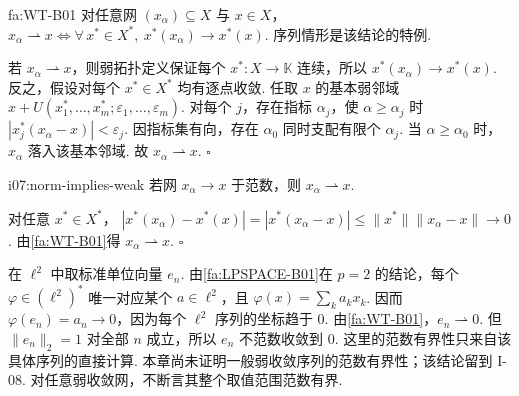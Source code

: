 \begin{FATheorem}[B][弱收敛的泛函刻画]{fa:WT-B01}
对任意网 \(\displaystyle (x_\alpha)\subseteq X\) 与 \(\displaystyle x\in X\)， \(\displaystyle x_\alpha\rightharpoonup x \iff \forall\,x^*\in X^*,\ x^*(x_\alpha)\to x^*(x)\).
序列情形是该结论的特例.
\end{FATheorem}

\begin{FAProof}
若 \(\displaystyle x_\alpha\rightharpoonup x\)，则弱拓扑定义保证每个 \(\displaystyle x^*:X\to\mathbb K\) 连续，所以 \(\displaystyle x^*(x_\alpha)\to x^*(x)\). 反之，假设对每个 \(\displaystyle x^*\in X^*\) 均有逐点收敛. 任取 \(\displaystyle x\) 的基本弱邻域 \(\displaystyle x+U(x_1^*,\dots,x_m^*;\varepsilon_1,\dots,\varepsilon_m)\).
对每个 \(\displaystyle j\)，存在指标 \(\displaystyle \alpha_j\)，使 \(\displaystyle \alpha\geqslant\alpha_j\) 时 \(\displaystyle |x_j^*(x_\alpha-x)|<\varepsilon_j\). 因指标集有向，存在 \(\displaystyle \alpha_0\) 同时支配有限个 \(\displaystyle \alpha_j\). 当 \(\displaystyle \alpha\geqslant\alpha_0\) 时，\(\displaystyle x_\alpha\) 落入该基本邻域. 故 \(\displaystyle x_\alpha\rightharpoonup x\).
\hfill\(\square\)
\end{FAProof}

\begin{FACorollary}[B][范数收敛蕴含弱收敛]{i07:norm-implies-weak}
若网 \(\displaystyle x_\alpha\to x\) 于范数，则 \(\displaystyle x_\alpha\rightharpoonup x\).
\end{FACorollary}

\begin{FAProof}
对任意 \(\displaystyle x^*\in X^*\)， \(\displaystyle |x^*(x_\alpha)-x^*(x)| =|x^*(x_\alpha-x)| \leqslant\|x^*\|\|x_\alpha-x\|\to0\).
由\autoref{fa:WT-B01}得 \(\displaystyle x_\alpha\rightharpoonup x\).
\hfill\(\square\)
\end{FAProof}

\begin{FACounterexample}[弱收敛不推出范数收敛]\label{i07:ce-weak-norm}
在 \(\displaystyle \ell^2\) 中取标准单位向量 \(\displaystyle e_n\). 由\autoref{fa:LPSPACE-B01}在 \(\displaystyle p=2\) 的结论，每个 \(\displaystyle \varphi\in(\ell^2)^*\) 唯一对应某个 \(\displaystyle a\in\ell^2\)，且 \(\displaystyle \varphi(x)=\sum_ka_kx_k\). 因而 \(\displaystyle \varphi(e_n)=a_n\to0\)，因为每个 \(\displaystyle \ell^2\) 序列的坐标趋于 \(\displaystyle0\). 由\autoref{fa:WT-B01}，\(\displaystyle e_n\rightharpoonup0\). 但 \(\displaystyle \|e_n\|_2=1\) 对全部 \(\displaystyle n\) 成立，所以 \(\displaystyle e_n\) 不范数收敛到 \(\displaystyle0\). 这里的范数有界性只来自该具体序列的直接计算. 本章尚未证明一般弱收敛序列的范数有界性；该结论留到 I-08. 对任意弱收敛网，不断言其整个取值范围范数有界.
\end{FACounterexample}

